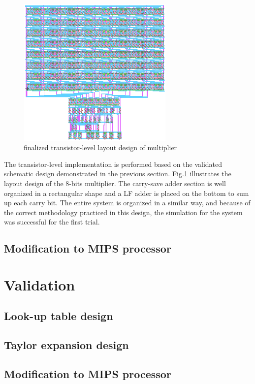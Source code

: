 \documentclass[10pt,journal]{IEEEtran}
\begin{document}
\begin{figure}[h]
\centering
\includegraphics[width=3in]{finalized_transistor_design.png}
\caption{finalized transistor-level layout design of multiplier}
\label{finalized_transistor_design}
\end{figure}


The transistor-level implementation is performed based on the validated schematic design demonstrated in the previous section. Fig.\ref{finalized_transistor_design} illustrates the layout design of the 8-bits multiplier. The carry-save adder section is well organized in a rectangular shape and a LF adder is placed on the bottom to sum up each carry bit. The entire system is organized in a similar way, and because of the correct methodology practiced in this design, the simulation for the system was successful for the first trial.

\subsection{Modification to MIPS processor}

\section{Validation}

	\subsection{Look-up table design}
	\subsection{Taylor expansion design}
	\subsection{Modification to MIPS processor}
\end{document}
